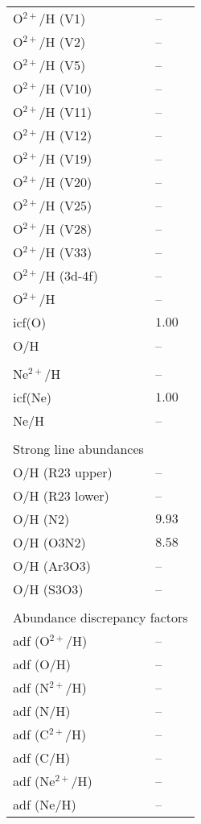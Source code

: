 \begin{longtable}[l]{ll}
 \\
 O$^{2+}$/H (V1)                     & -- \\
 O$^{2+}$/H (V2)                     & -- \\
 O$^{2+}$/H (V5)                     & -- \\
 O$^{2+}$/H (V10)                    & -- \\
 O$^{2+}$/H (V11)                    & -- \\
 O$^{2+}$/H (V12)                    & -- \\
 O$^{2+}$/H (V19)                    & -- \\
 O$^{2+}$/H (V20)                    & -- \\
 O$^{2+}$/H (V25)                    & -- \\
 O$^{2+}$/H (V28)                    & -- \\
 O$^{2+}$/H (V33)                    & -- \\
 O$^{2+}$/H (3d-4f)                  & -- \\
 O$^{2+}$/H                          & -- \\
 icf(O)                              & $  1.00$\\
 O/H                                 & -- \\
 \\
 Ne$^{2+}$/H                         & -- \\
 icf(Ne)                             & $  1.00$\\
 Ne/H                                & -- \\
 \vspace{0.2cm}\\\multicolumn{2}{l}{Strong line abundances}\\ \hline
 O/H (R23 upper)                     & -- \\
 O/H (R23 lower)                     & -- \\
 O/H (N2)                            & $  9.93$\\
 O/H (O3N2)                          & $  8.58$\\
 O/H (Ar3O3)                         & -- \\
 O/H (S3O3)                          & -- \\
 \vspace{0.2cm}\\\multicolumn{2}{l}{Abundance discrepancy factors}\\ \hline
 adf (O$^{2+}$/H)                    & -- \\
 adf (O/H)                           & -- \\
 adf (N$^{2+}$/H)                    & -- \\
 adf (N/H)                           & -- \\
 adf (C$^{2+}$/H)                    & -- \\
 adf (C/H)                           & -- \\
 adf (Ne$^{2+}$/H)                   & -- \\
 adf (Ne/H)                          & -- \\
 \end{longtable}
